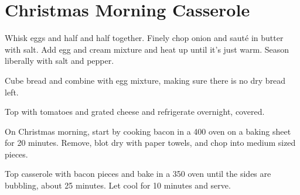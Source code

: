 
\section{Christmas Morning Casserole}
\begin{recipe}



Whisk eggs and half and half together. Finely chop onion and sauté in butter with salt. Add egg and cream mixture and heat up until it's just warm. Season liberally with salt and pepper.

Cube bread and combine with egg mixture, making sure there is no dry bread left.

Top with tomatoes and grated cheese and refrigerate overnight, covered.


On Christmas morning, start by cooking bacon in a 400\degree{} oven on a baking sheet for 20 minutes. Remove, blot dry with paper towels, and chop into medium sized pieces.

Top casserole with bacon pieces and bake in a 350\degree{} oven until the sides are bubbling, about 25 minutes. Let cool for 10 minutes and serve.

\end{recipe}
